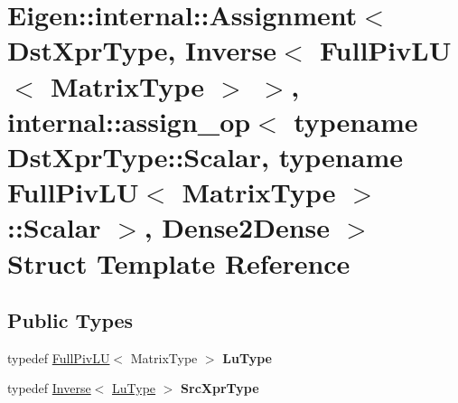\hypertarget{struct_eigen_1_1internal_1_1_assignment_3_01_dst_xpr_type_00_01_inverse_3_01_full_piv_l_u_3_01_m9a195c884433725cd2990fc22dc66c56}{}\section{Eigen\+::internal\+::Assignment$<$ Dst\+Xpr\+Type, Inverse$<$ Full\+Piv\+LU$<$ Matrix\+Type $>$ $>$, internal\+::assign\+\_\+op$<$ typename Dst\+Xpr\+Type\+::Scalar, typename Full\+Piv\+LU$<$ Matrix\+Type $>$\+::Scalar $>$, Dense2\+Dense $>$ Struct Template Reference}
\label{struct_eigen_1_1internal_1_1_assignment_3_01_dst_xpr_type_00_01_inverse_3_01_full_piv_l_u_3_01_m9a195c884433725cd2990fc22dc66c56}
\subsection*{Public Types}
\begin{DoxyCompactItemize}
\item 
\mbox{\label{struct_eigen_1_1internal_1_1_assignment_3_01_dst_xpr_type_00_01_inverse_3_01_full_piv_l_u_3_01_m9a195c884433725cd2990fc22dc66c56_a36faa9b66f3e8c7c4089e6c8e9ffcbd1}} 
typedef \mbox{\hyperlink{class_eigen_1_1_full_piv_l_u}{Full\+Piv\+LU}}$<$ Matrix\+Type $>$ {\bfseries Lu\+Type}
\item 
\mbox{\label{struct_eigen_1_1internal_1_1_assignment_3_01_dst_xpr_type_00_01_inverse_3_01_full_piv_l_u_3_01_m9a195c884433725cd2990fc22dc66c56_ae71e99a024a87e924b473ab919a917df}} 
typedef \mbox{\hyperlink{class_eigen_1_1_inverse}{Inverse}}$<$ \mbox{\hyperlink{class_eigen_1_1_full_piv_l_u}{Lu\+Type}} $>$ {\bfseries Src\+Xpr\+Type}
\end{DoxyCompactItemize}
